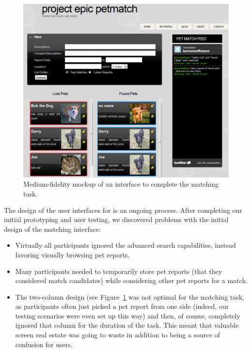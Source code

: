 \begin{figure}[htbp]
    \begin{center}
	\includegraphics[width=150mm]{figs/design2.png}
    \end{center}
        \caption[Second Interface Prototype]{
        Medium-fidelity mockup of an interface to complete the matching task.
	}
	 \label{fig:design2}
\end{figure}

The design of the user interfaces for \nplh{} is an ongoing process.  After completing our initial prototyping \cite{sdc} and user testing, we discovered problems with the initial design of the matching interface:

\begin{itemize}
  \item{} Virtually all participants ignored the advanced search capabilities, instead favoring visually browsing pet reports.
  \item{} Many participants needed to temporarily store pet reports (that they considered match candidates) while considering other pet reports for a match.
  \item{} The two-column design (see Figure~\ref{fig:design2} was not optimal for the matching task, as participants often just picked a pet report from one side (indeed, our testing scenarios were even set up this way) and then, of course, completely ignored that column for the duration of the task.  This meant that valuable screen real estate was going to waste in addition to being a source of confusion for users.
\end{itemize}

